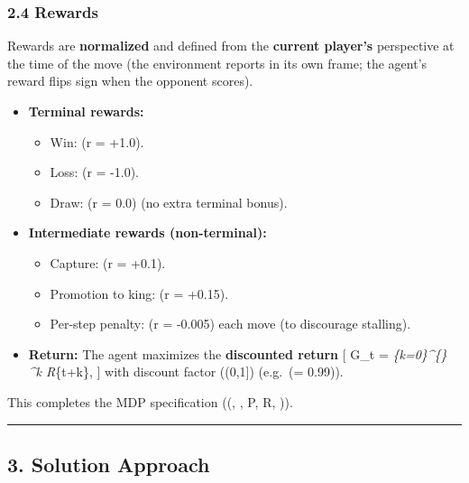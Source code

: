 \documentclass[
]{article}
\providecommand{\tightlist}{%
  \setlength{\itemsep}{0pt}\setlength{\parskip}{0pt}}
\begin{document}
\subsubsection{2.4 Rewards}\label{rewards}

Rewards are \textbf{normalized} and defined from the \textbf{current
player's} perspective at the time of the move (the environment reports
in its own frame; the agent's reward flips sign when the opponent
scores).

\begin{itemize}
\tightlist
\item
  \textbf{Terminal rewards:}

  \begin{itemize}
  \tightlist
  \item
    Win: (r = +1.0).\\
  \item
    Loss: (r = -1.0).\\
  \item
    Draw: (r = 0.0) (no extra terminal bonus).
  \end{itemize}
\item
  \textbf{Intermediate rewards (non-terminal):}

  \begin{itemize}
  \tightlist
  \item
    Capture: (r = +0.1).\\
  \item
    Promotion to king: (r = +0.15).\\
  \item
    Per-step penalty: (r = -0.005) each move (to discourage stalling).
  \end{itemize}
\item
  \textbf{Return:} The agent maximizes the \textbf{discounted return}
  {[} G\_t = \sum\emph{\{k=0\}\^{}\{\infty\} \gamma\^{}k R}\{t+k\}, {]}
  with discount factor (\gamma \in (0,1{]}) (e.g.~(\gamma = 0.99)).
\end{itemize}

This completes the MDP specification ((, , P, R,
\gamma)).

\begin{center}\rule{0.5\linewidth}{0.5pt}\end{center}

\subsection{3. Solution Approach}\label{solution-approach}
\end{document}
